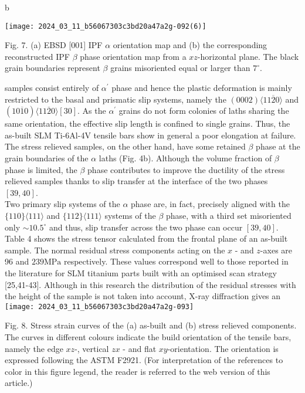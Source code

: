 \documentclass[10pt]{article}
\begin{document}
b

\begin{center}
\texttt{[image: 2024\_03\_11\_b56067303c3bd20a47a2g-092(6)]}
\end{center}

Fig. 7. (a) EBSD [001] IPF $\alpha$ orientation map and (b) the corresponding reconstructed IPF $\beta$ phase orientation map from a $x z$-horizontal plane. The black grain boundaries represent $\beta$ grains misoriented equal or larger than $7^{\circ}$.

samples consist entirely of $\alpha^{\prime}$ phase and hence the plastic deformation is mainly restricted to the basal and prismatic slip systems, namely the $(0002)\langle 11 \overline{2} 0\rangle$ and $(10 \overline{1} 0)\langle 11 \overline{2} 0\rangle[30]$. As the $\alpha^{\prime}$ grains do not form colonies of laths sharing the same orientation, the effective slip length is confined to single grains. Thus, the as-built SLM Ti-6Al-4V tensile bars show in general a poor elongation at failure. The stress relieved samples, on the other hand, have some retained $\beta$ phase at the grain boundaries of the $\alpha$ laths (Fig. 4b). Although the volume fraction of $\beta$ phase is limited, the $\beta$ phase contributes to improve the ductility of the stress relieved samples thanks to slip transfer at the interface of the two phases $[39,40]$.\\
Two primary slip systems of the $\alpha$ phase are, in fact, precisely aligned with the $\{110\}\langle 111\rangle$ and $\{112\}\langle 111\rangle$ systems of the $\beta$ phase, with a third set misoriented only $\sim 10.5^{\circ}$ and thus, slip transfer across the two phase can occur $[39,40]$. Table 4 shows the stress tensor calculated from the frontal plane of an as-built sample. The normal residual stress components acting on the $x$ - and $z$-axes are 96 and $239 \mathrm{MPa}$ respectively. These values correspond well to those reported in the literature for SLM titanium parts built with an optimised scan strategy [25,41-43]. Although in this research the distribution of the residual stresses with the height of the sample is not taken into account, X-ray diffraction gives an\\
\texttt{[image: 2024\_03\_11\_b56067303c3bd20a47a2g-093]}

Fig. 8. Stress strain curves of the (a) as-built and (b) stress relieved components. The curves in different colours indicate the build orientation of the tensile bars, namely the edge $x z$-, vertical $z x$ - and flat $x y$-orientation. The orientation is expressed following the ASTM F2921. (For interpretation of the references to color in this figure legend, the reader is referred to the web version of this article.)
\end{document}
